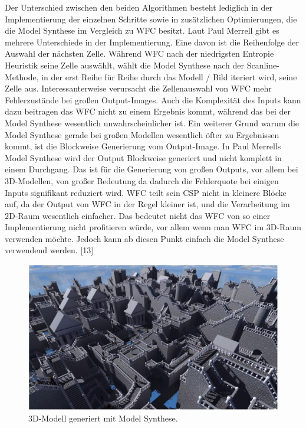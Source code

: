 \documentclass[12pt, a4paper,twoside,openright]{report}
\begin{document}
Der Unterschied zwischen den beiden Algorithmen besteht lediglich in der Implementierung der einzelnen Schritte sowie in zusätzlichen Optimierungen,
die die Model Synthese im Vergleich zu WFC besitzt.
Laut Paul Merrell gibt es mehrere Unterschiede in der Implementierung.
\newline
Eine davon ist die Reihenfolge der Auswahl der nächsten Zelle.
Während WFC nach der niedrigsten Entropie Heuristik seine Zelle auswählt,
wählt die Model Synthese nach der Scanline-Methode, in der erst Reihe für Reihe durch das Modell / Bild iteriert wird, seine Zelle aus.
Interessanterweise verursacht die Zellenauswahl von WFC mehr Fehlerzustände bei großen Output-Images.
Auch die Komplexität des Inputs kann dazu beitragen das WFC nicht zu einem Ergebnis kommt, während das bei der Model Synthese wesentlich unwahrscheinlicher ist.
\newline
Ein weiterer Grund warum die Model Synthese gerade bei großen Modellen wesentlich öfter zu Ergebnissen kommt, ist die Blockweise Generierung vom Output-Image.
In Paul Merrells Model Synthese wird der Output Blockweise generiert und nicht komplett in einem Durchgang.
Das ist für die Generierung von großen Outputs, vor allem bei 3D-Modellen, von großer Bedeutung da dadurch die Fehlerquote bei einigen Inputs signifikant reduziert wird.
WFC teilt sein CSP nicht in kleinere Blöcke auf, da der Output von WFC in der Regel kleiner ist, und die Verarbeitung im 2D-Raum wesentlich einfacher.
Das bedeutet nicht das WFC von so einer Implementierung nicht profitieren würde, vor allem wenn man WFC im 3D-Raum verwenden möchte.
Jedoch kann ab diesen Punkt einfach die Model Synthese verwendend werden. {[13]}

\begin{figure}[H]
    \centering
    \includegraphics[width=1\linewidth]{images/3D-model-synthese.JPG}%
    \caption{3D-Modell generiert mit Model Synthese.}%
\end{figure}
\end{document}
